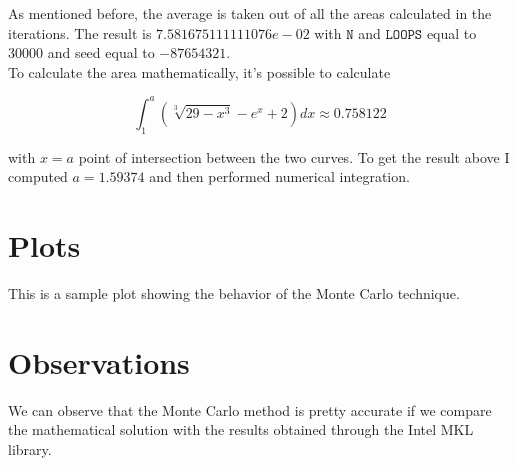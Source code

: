 \documentclass{article}
\newcommand{\code}{\texttt}
\begin{document}
As mentioned before, the average is taken out of all the areas calculated in the iterations. The result is $7.581675111111076e-02$ with $\code{N}$ and $\code{LOOPS}$ equal to 30000 and seed equal to $-87654321$.\\

To calculate the area mathematically, it's possible to calculate

$$
\int_1^{a} (\sqrt[3]{29-x^3}-e^x+2)dx\approx 0.758122
$$

with $x=a$ point of intersection between the two curves. To get the result above I computed $a=1.59374$ and then performed numerical integration.

\section{Plots}
This is a sample plot showing the behavior of the Monte Carlo technique.

\section{Observations}
We can observe that the Monte Carlo method is pretty accurate if we compare the mathematical solution with the results obtained through the Intel MKL library.
\end{document}
